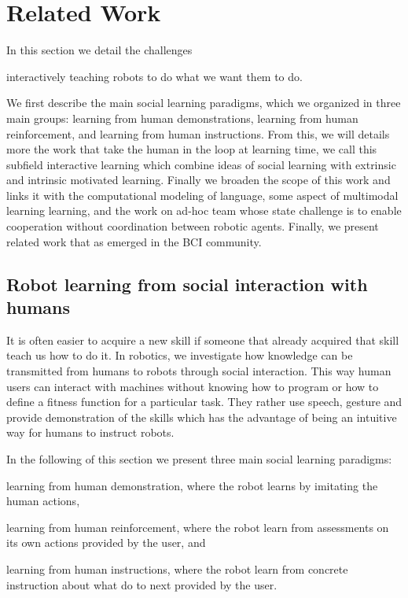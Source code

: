 
\chapter{Related Work}
\label{chapter:relatedwork}
\minitoc

In this section we detail the challenges

interactively teaching robots to do what we want them to do. 

We first describe the main social learning paradigms, which we organized in three main groups: learning from human demonstrations, learning from human reinforcement, and learning from human instructions. From this, we will details more the work that take the human in the loop at learning time, we call this subfield interactive learning which combine ideas of social learning with extrinsic and intrinsic motivated learning. Finally we broaden the scope of this work and links it with the computational modeling of language, some aspect of multimodal learning learning, and the work on ad-hoc team whose state challenge is to enable cooperation without coordination between robotic agents. Finally, we present related work that as emerged in the BCI community.

\section{Robot learning from social interaction with humans}
\label{sec:intro:social}

It is often easier to acquire a new skill if someone that already acquired that skill teach us how to do it. In robotics, we investigate how knowledge can be transmitted from humans to robots through social interaction. This way human users can interact with machines without knowing how to program or how to define a fitness function for a particular task. They rather use speech, gesture and provide demonstration of the skills which has the advantage of being an intuitive way for humans to instruct robots. 

In the following of this section we present three main social learning paradigms: \begin{inparaenum}[(a)] \item learning from human demonstration, where the robot learns by imitating the human actions, \item learning from human reinforcement, where the robot learn from assessments on its own actions provided by the user, and \item learning from human instructions, where the robot learn from concrete instruction about what do to next provided by the user. \end{inparaenum}

